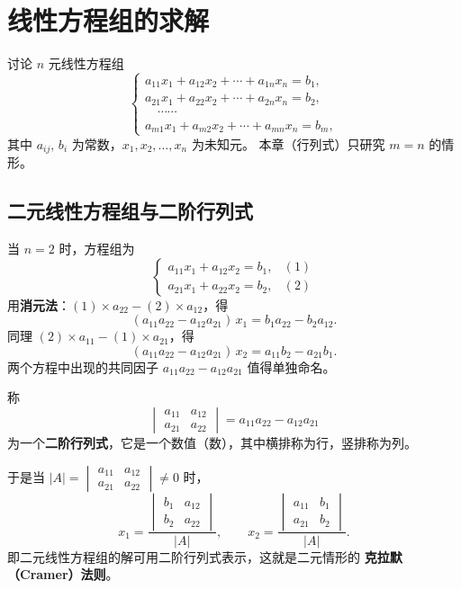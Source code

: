 ﻿%

\section{线性方程组的求解}

讨论 $n$ 元线性方程组
\begin{equation}
\begin{cases}
a_{11}x_1 + a_{12}x_2 + \cdots + a_{1n}x_n = b_1,\\
a_{21}x_1 + a_{22}x_2 + \cdots + a_{2n}x_n = b_2,\\
\quad\cdots\cdots\\
a_{m1}x_1 + a_{m2}x_2 + \cdots + a_{mn}x_n = b_m,
\end{cases}
\end{equation}
其中 $a_{ij},\,b_i$ 为常数，$x_1,x_2,\dots,x_n$ 为未知元。
本章（行列式）只研究 $m=n$ 的情形。

\subsection{二元线性方程组与二阶行列式}

当 $n=2$ 时，方程组为
\begin{equation}
\begin{cases}
a_{11}x_1 + a_{12}x_2 = b_1, & (1)\\
a_{21}x_1 + a_{22}x_2 = b_2, & (2)
\end{cases}
\end{equation}
用\textbf{消元法}：$(1)\times a_{22}-(2)\times a_{12}$，得
\[
(a_{11}a_{22}-a_{12}a_{21})\,x_1 = b_1a_{22}-b_2a_{12}.
\]
同理 $(2)\times a_{11}-(1)\times a_{21}$，得
\[
(a_{11}a_{22}-a_{12}a_{21})\,x_2 = a_{11}b_2-a_{21}b_1.
\]
两个方程中出现的共同因子 $a_{11}a_{22}-a_{12}a_{21}$ 值得单独命名。

\begin{definition}[二阶行列式]
称
\[
\begin{vmatrix}
a_{11} & a_{12}\\
a_{21} & a_{22}
\end{vmatrix}
= a_{11}a_{22}-a_{12}a_{21}
\]
为一个\textbf{二阶行列式}，它是一个数值（数），其中横排称为行，竖排称为列。
\end{definition}

于是当 $|A|=\begin{vmatrix} a_{11} & a_{12}\\ a_{21} & a_{22}\end{vmatrix}\neq 0$ 时，
\[
x_1=\frac{\begin{vmatrix} b_1 & a_{12}\\ b_2 & a_{22}\end{vmatrix}}{|A|},
\qquad
x_2=\frac{\begin{vmatrix} a_{11} & b_1\\ a_{21} & b_2\end{vmatrix}}{|A|}.
\]
即二元线性方程组的解可用二阶行列式表示，这就是二元情形的
\textbf{克拉默（Cramer）法则}。

